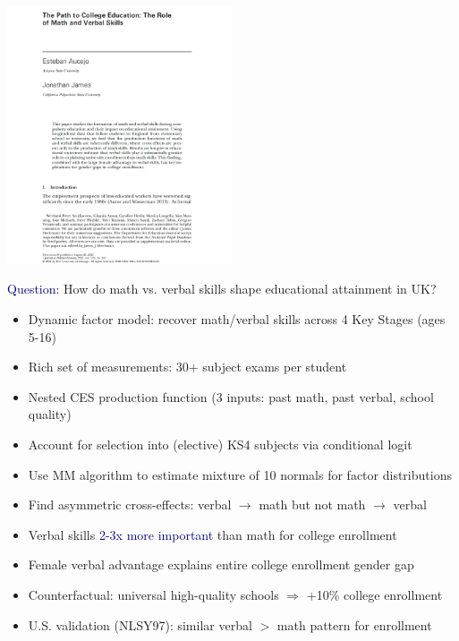 \documentclass[aspectratio=169]{beamer}
\begin{document}
\begin{frame}
\centering
\includegraphics[width=0.5\textwidth]{Aucejo_James_2021_JPE_cover.jpg}
\end{frame}

\begin{frame}
\textcolor{navy}{Question:} How do math vs. verbal skills shape educational attainment in UK?
\bigskip

\begin{itemize}
\itemsep1.5em
\item<2-> Dynamic factor model: recover math/verbal skills across 4 Key Stages (ages 5-16)
\item<3-> Rich set of measurements: 30+ subject exams per student
\item<4-> Nested CES production function (3 inputs: past math, past verbal, school quality)
\item<6-> Account for selection into (elective) KS4 subjects via conditional logit
\end{itemize}
\end{frame}

\begin{frame}
\begin{itemize}
\itemsep1.5em
\item<1-> Use MM algorithm to estimate mixture of 10 normals for factor distributions
\item<2-> Find asymmetric cross-effects: verbal $\to$ math but not math $\to$ verbal
\item<3-> Verbal skills \textcolor{navy}{2-3x more important} than math for college enrollment
\item<4-> Female verbal advantage explains entire college enrollment gender gap
\item<5-> Counterfactual: universal high-quality schools $\Rightarrow$ +10\% college enrollment
\item<6-> U.S. validation (NLSY97): similar verbal $>$ math pattern for enrollment
\end{itemize}
\end{frame}
\end{document}

